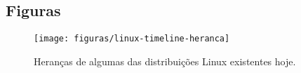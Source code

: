 \begin{anexosenv}

\partanexos


\chapter{\nmu Figuras}\label{long_figures}


\begin{figure}[h]
  \centering
	\texttt{[image: figuras/linux-timeline-heranca]}
  \caption[Heranças de algumas das distribuições Linux existentes hoje]{Heranças de algumas das distribuições Linux existentes hoje\protect\footnotemark.}
  \label{fig:figuras_linux_timeline_heranca}
\end{figure}


\end{anexosenv}


